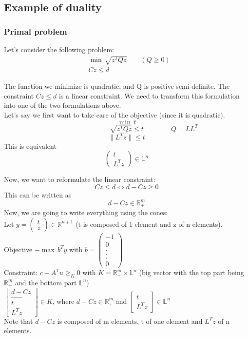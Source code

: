 \subsection{Example of duality}

\subsubsection{Primal problem}
Let's consider the following problem: 
\begin{align*}
&\min \, \sqrt{z^TQz} \qquad (Q\geq 0)\\
&Cz \leq d
\end{align*}

The function we minimize is quadratic, and Q is positive semi-definite. The constraint $Cz \leq d$ is a linear constraint. We need to transform this formulation into one of the two formulations above. \\
Let's say we first want to take care of the objective (since it is quadratic). 
$$\min \, t$$
$$\qquad \qquad \qquad \qquad \sqrt{z^TQz}\leq t \qquad \qquad Q=LL^T$$
$$\parallel L^Tz \parallel \leq t$$
This is equivalent 
$$\begin{pmatrix}
t\\
L^Tz
\end{pmatrix} \in \mathbb{L}^n$$

Now, we want to reformulate the linear constraint: 
$$Cz\leq d \Longleftrightarrow d-Cz \geq 0$$
This can be written as 
$$d-Cz \in \mathbb{R}^m_+$$
Now, we are going to write everything using the cones: \\
Let $y=\begin{pmatrix}
t\\
z
\end{pmatrix} \in \mathbb{R}^{n+1}$ (t is composed of 1 element and z of n elements). \\
Objective $-\max \, b^Ty$ with $b=\begin{pmatrix}
-1\\
0\\
. \\
. \\
. \\
0
\end{pmatrix}$\\
Constraint: $c-A^Tu \geq_K 0 $ with $K= \mathbb{R}^m_+ \times \mathbb{L}^n$ (big vector with the top part being $\mathbb{R}^m_+$ and the bottom part $\mathbb{L}^n$)\\

$\begin{bmatrix}
d-Cz\\
\_ \_ \_ \_ \_ \\
t\\
L^Tz
\end{bmatrix} \in K$, where $d-Cz \in \mathbb{R}^m_+$ and $\begin{bmatrix}
t\\
L^Tz
\end{bmatrix} \in \mathbb{L}^n$\\
Note that $d-Cz$ is composed of m elements, t of one element and $L^Tz$ of n elements. \\

